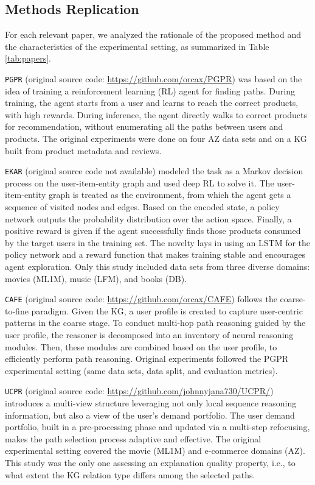 \documentclass[runningheads]{llncs}
\begin{document}
\subsection{Methods Replication}
For each relevant paper, we analyzed the rationale of the proposed method and the characteristics of the experimental setting, as summarized in Table \ref{tab:papers}.

\texttt{PGPR} \cite{pgpr} (original source code: \url{https://github.com/orcax/PGPR}) 
was based on the idea of training a reinforcement learning (RL) agent for finding paths. 
During training, the agent starts from a user and learns to reach the correct products, with high rewards.
During inference, the agent directly walks to correct products for recommendation, without enumerating all the paths between users and products. 
The original experiments were done on four AZ data sets \cite{amazon_dataset} and on a KG built from product metadata and reviews. 

\texttt{EKAR} \cite{Song2019EkarAE} (original source code not available) 
modeled the task as a Markov decision process on the user-item-entity graph and used deep RL to solve it. 
The user-item-entity graph is treated as the environment, from which the agent gets a sequence of visited nodes and edges. 
Based on the encoded state, a policy network outputs the probability distribution over the action space. 
Finally, a positive reward is given if the agent successfully finds those products consumed by the target users in the training set. 
The novelty lays in using an LSTM for the policy network and a reward function that makes training stable and encourages agent exploration. 
Only this study included data sets from three diverse domains: movies (ML1M), music (LFM), and books (DB). 

\texttt{CAFE} \cite{cafe} (original source code: \url{https://github.com/orcax/CAFE}) 
follows the coarse-to-fine paradigm.
Given the KG, a user profile is created to capture user-centric patterns in the coarse stage. 
To conduct multi-hop path reasoning guided by the user profile, the reasoner is decomposed into an inventory of neural reasoning modules. 
Then, these modules are combined based on the user profile, to efficiently perform path reasoning. 
Original experiments followed the PGPR experimental setting (same data sets, data split, and evaluation metrics). 

\texttt{UCPR} \cite{usercentric} (original source code: \url{https://github.com/johnnyjana730/UCPR/}) 
introduces a multi-view structure leveraging not only local sequence reasoning information, but also a view of the user’s demand portfolio.
The user demand portfolio, built in a pre-processing phase and updated via a multi-step refocusing, makes the path selection process adaptive and effective. 
The original experimental setting covered the movie (ML1M) and e-commerce domains (AZ). 
This study was the only one assessing an explanation quality property, i.e., to what extent the KG relation type differs among the selected paths. 
\end{document}
